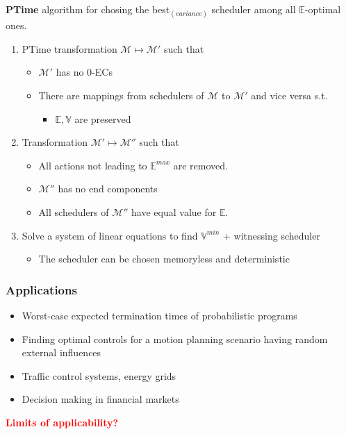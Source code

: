 \documentclass[onlymath]{beamer}
\begin{document}
\begin{frame}
	\begin{block}{\textbf{PTime} algorithm for chosing the best$_{(variance)}$ scheduler among all $\mathbb{E}$-optimal ones.}
		\begin{enumerate}
			\item PTime transformation $\mathcal{M} \mapsto \mathcal{M}'$ such that \begin{itemize} \pause
				\item $\mathcal{M}'$ has no 0-ECs \pause
				\item There are mappings from schedulers of $\mathcal{M}$ to $\mathcal{M}'$ and vice versa s.t. \begin{itemize} \pause
					\item $\mathbb{E}, \mathbb{V}$ are preserved \pause
				\end{itemize}
			\end{itemize}
			\item Transformation $\mathcal{M}' \mapsto \mathcal{M}''$ such that \begin{itemize} \pause
				\item All actions not leading to $\mathbb{E}^{max}$ are removed.\pause
				\item $\mathcal{M}''$ has no end components \pause
				\item All schedulers of $\mathcal{M}''$ have equal value for $\mathbb{E}$. \pause
			\end{itemize}
			\item Solve a system of linear equations to find $\mathbb{V}^{min}$ + witnessing scheduler \pause \begin{itemize}
				\item The scheduler can be chosen memoryless and deterministic
			\end{itemize}
		\end{enumerate}
	\end{block}
\end{frame}

\begin{frame}
	\frametitle{Applications}
	\begin{itemize}
		\item Worst-case expected termination times of probabilistic programs \pause
		\item Finding optimal controls for a motion planning scenario having random external influences \pause
		\item Traffic control systems, energy grids \pause
		\item Decision making in financial markets \pause
	\end{itemize}
	\textcolor{red}{\textbf{Limits of applicability?}}
\end{frame}
\end{document}
